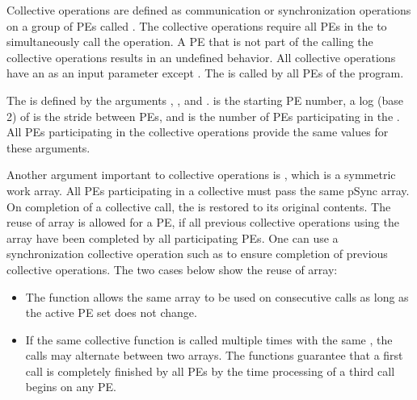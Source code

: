 
Collective operations are defined as communication or synchronization operations 
on a group of \ac{PE}s called \activeset{}. The collective operations require all
\ac{PE}s in the \activeset{} to simultaneously call the operation. 
A \ac{PE} that is not part of the \activeset{} calling the collective 
operations results in an undefined behavior.  All
collective operations have an \activeset{} as an input parameter except \barrierall{}. The \barrierall{} is called by all \ac{PE}s of the \openshmem{} program. 

The \activeset{} is defined by the arguments , , 
and .   is the starting \ac{PE} number, a log (base 2) of  is the stride between \ac{PE}s, and  is the number of \ac{PE}s participating in the \activeset{}.  All \ac{PE}s participating in the 
collective operations provide the same values for these arguments. 
 
Another argument important to collective operations is , which is a symmetric work array.  All \ac{PE}s participating in a collective must pass the same
pSync array.  On completion of a collective call, the  is restored to its 
original contents.  The reuse of  array is allowed for a \ac{PE}, if all previous collective operations using the  array have been completed by all participating 
\ac{PE}s.  One can use a synchronization collective operation such as \barrier{}
to ensure completion of previous collective operations.  The two cases below
show the reuse of  array:

\begin{itemize}
\item The  function allows the same  array to be 		used on consecutive calls as long as the active \ac{PE} set does not change.
\item  If the same collective function is called multiple times with the
          same \activeset, the calls may alternate between two  arrays.
          The \openshmem functions guarantee that a first call is completely finished by 
          all \ac{PE}s by the time processing of a third  call  begins  on any \ac{PE}.          
\end{itemize}


